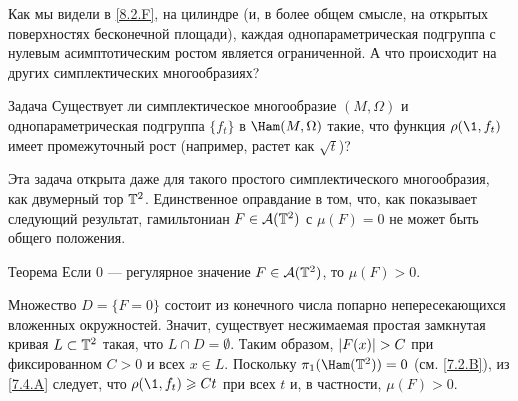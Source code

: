 Как мы видели в \ref{8.2.F}, на цилиндре 
(и, в более общем смысле, на открытых поверхностях бесконечной площади),
каждая однопараметрическая подгруппа с нулевым асимптотическим ростом является ограниченной. 
А что происходит на других симплектических многообразиях?

\begin{ex}{Задача}\label{8.4.A}
Существует ли симплектическое многообразие $(M, \Omega)$ и
однопараметрическая подгруппа $\{f_t\}$ в $\Ham (M, \Omega)$ такие,
что функция $\rho (\1, f_t)$ имеет промежуточный рост
(например, растет как $\sqrt{t}$)? 
\end{ex}

Эта задача открыта даже для такого простого симплектического
многообразия, как двумерный тор $\mathbb{T}^2$. 
Единственное оправдание в том, что, как показывает следующий
результат, гамильтониан $F \z\in \A (\TT^2)$ с $\mu (F) = 0$ не может быть
общего положения. 

\begin{thm}{Теорема}\label{8.4.B}
Если 0 --- регулярное значение $F \in \mathcal{A} (\mathbb{T}^2)$, то $\mu (F)> 0$.
\end{thm}

Множество $D = \{F = 0\}$ состоит из конечного числа попарно
непересекающихся вложенных окружностей. 
Значит, существует несжимаемая простая замкнутая кривая $L \z\subset
\TT^2$ такая, что $L\cap D = \emptyset$. 
Таким образом, $|F (x)| \z> C$ при фиксированном $C> 0$ и всех $x \in L$.
Поскольку $\pi_1 (\Ham (\TT^2)) = 0$ (см. \ref{7.2.B}),  из
\ref{7.4.A} следует, что $\rho (\1, f_t) \ge Ct$ при всех $t$ и, в
частности, $\mu (F)> 0$. 
\qeds

